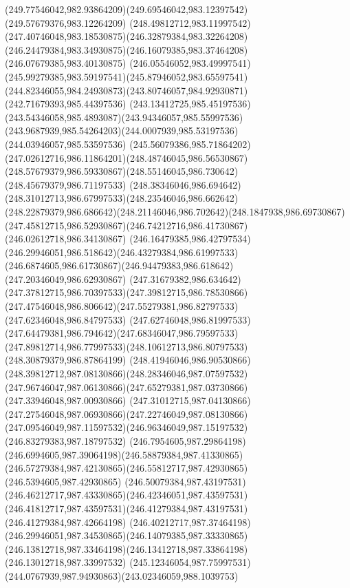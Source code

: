 {{		\curveto(249.77546042,982.93864209)(249.69546042,983.12397542)(249.57679376,983.12264209)
		\curveto(248.49812712,983.11997542)(247.40746048,983.18530875)(246.32879384,983.32264208)
		\curveto(246.24479384,983.34930875)(246.16079385,983.37464208)(246.07679385,983.40130875)
		\curveto(246.05546052,983.49997541)(245.99279385,983.59197541)(245.87946052,983.65597541)
		\curveto(244.82346055,984.24930873)(243.80746057,984.92930871)(242.71679393,985.44397536)
		\curveto(243.13412725,985.45197536)(243.54346058,985.4893087)(243.94346057,985.55997536)
		\curveto(243.9687939,985.54264203)(244.0007939,985.53197536)(244.03946057,985.53597536)
		\curveto(245.56079386,985.71864202)(247.02612716,986.11864201)(248.48746045,986.56530867)
		\curveto(248.57679379,986.59330867)(248.55146045,986.730642)(248.45679379,986.71197533)
		\curveto(248.38346046,986.694642)(248.31012713,986.67997533)(248.23546046,986.662642)
		\curveto(248.22879379,986.686642)(248.21146046,986.702642)(248.1847938,986.69730867)
		\curveto(247.45812715,986.52930867)(246.74212716,986.41730867)(246.02612718,986.34130867)
		\curveto(246.16479385,986.42797534)(246.29946051,986.518642)(246.43279384,986.61997533)
		\curveto(246.6874605,986.61730867)(246.94479383,986.618642)(247.20346049,986.62930867)
		\curveto(247.31679382,986.634642)(247.37812715,986.70397533)(247.39812715,986.78530866)
		\curveto(247.47546048,986.806642)(247.55279381,986.82797533)(247.62346048,986.84797533)
		\curveto(247.62746048,986.81997533)(247.64479381,986.794642)(247.68346047,986.79597533)
		\curveto(247.89812714,986.77997533)(248.10612713,986.80797533)(248.30879379,986.87864199)
		\curveto(248.41946046,986.90530866)(248.39812712,987.08130866)(248.28346046,987.07597532)
		\curveto(247.96746047,987.06130866)(247.65279381,987.03730866)(247.33946048,987.00930866)
		\curveto(247.31012715,987.04130866)(247.27546048,987.06930866)(247.22746049,987.08130866)
		\curveto(247.09546049,987.11597532)(246.96346049,987.15197532)(246.83279383,987.18797532)
		\curveto(246.7954605,987.29864198)(246.6994605,987.39064198)(246.58879384,987.41330865)
		\curveto(246.57279384,987.42130865)(246.55812717,987.42930865)(246.5394605,987.42930865)
		\curveto(246.50079384,987.43197531)(246.46212717,987.43330865)(246.42346051,987.43597531)
		\curveto(246.41812717,987.43597531)(246.41279384,987.43197531)(246.41279384,987.42664198)
		\curveto(246.40212717,987.37464198)(246.29946051,987.34530865)(246.14079385,987.33330865)
		\curveto(246.13812718,987.33464198)(246.13412718,987.33864198)(246.13012718,987.33997532)
		\curveto(245.12346054,987.75997531)(244.0767939,987.94930863)(243.02346059,988.1039753)
}}
